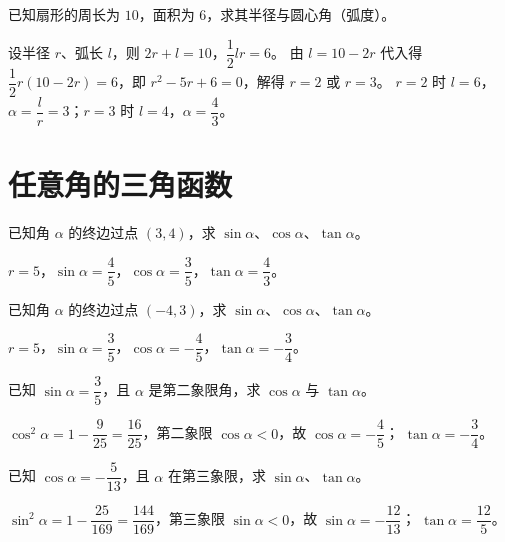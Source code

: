 \begin{problem}
已知扇形的周长为 $10$，面积为 $6$，求其半径与圆心角（弧度）。
\end{problem}
\begin{solution}
设半径 $r$、弧长 $l$，则 $2r+l=10$，$\dfrac12lr=6$。
由 $l=10-2r$ 代入得 $\dfrac12r(10-2r)=6$，即 $r^2-5r+6=0$，解得 $r=2$ 或 $r=3$。
$r=2$ 时 $l=6$，$\alpha=\dfrac lr=3$；$r=3$ 时 $l=4$，$\alpha=\dfrac43$。
\end{solution}

\section{任意角的三角函数}

\begin{problem}
已知角 $\alpha$ 的终边过点 $(3,4)$，求 $\sin\alpha$、$\cos\alpha$、$\tan\alpha$。
\end{problem}
\begin{solution}
$r=5$，$\sin\alpha=\dfrac45$，$\cos\alpha=\dfrac35$，$\tan\alpha=\dfrac43$。
\end{solution}

\begin{problem}
已知角 $\alpha$ 的终边过点 $(-4,3)$，求 $\sin\alpha$、$\cos\alpha$、$\tan\alpha$。
\end{problem}
\begin{solution}
$r=5$，$\sin\alpha=\dfrac35$，$\cos\alpha=-\dfrac45$，$\tan\alpha=-\dfrac34$。
\end{solution}

\begin{problem}
已知 $\sin\alpha=\dfrac35$，且 $\alpha$ 是第二象限角，求 $\cos\alpha$ 与 $\tan\alpha$。
\end{problem}
\begin{solution}
$\cos^2\alpha=1-\dfrac{9}{25}=\dfrac{16}{25}$，第二象限 $\cos\alpha<0$，故 $\cos\alpha=-\dfrac45$；
$\tan\alpha=-\dfrac34$。
\end{solution}

\begin{problem}
已知 $\cos\alpha=-\dfrac{5}{13}$，且 $\alpha$ 在第三象限，求 $\sin\alpha$、$\tan\alpha$。
\end{problem}
\begin{solution}
$\sin^2\alpha=1-\dfrac{25}{169}=\dfrac{144}{169}$，第三象限 $\sin\alpha<0$，故 $\sin\alpha=-\dfrac{12}{13}$；
$\tan\alpha=\dfrac{12}{5}$。
\end{solution}

